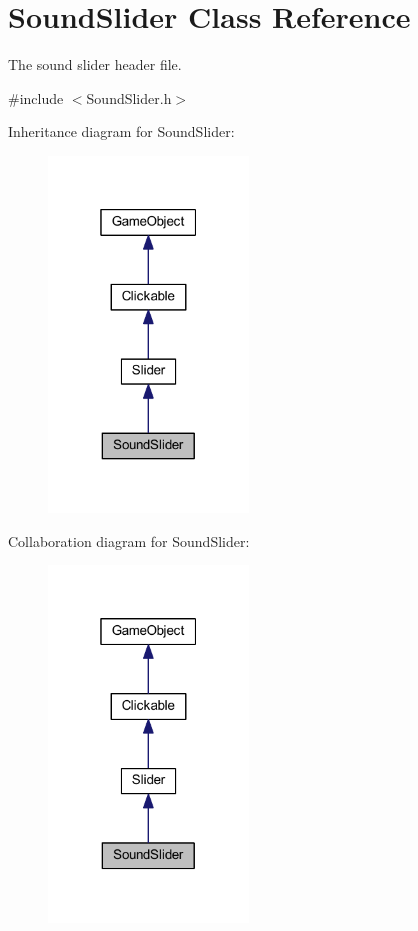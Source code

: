 \hypertarget{class_sound_slider}{\section{Sound\+Slider Class Reference}
\label{class_sound_slider}
}


The sound slider header file.  




{\ttfamily \#include $<$Sound\+Slider.\+h$>$}



Inheritance diagram for Sound\+Slider\+:
\nopagebreak
\begin{figure}[H]
\begin{center}
\leavevmode
\includegraphics[width=151pt]{class_sound_slider__inherit__graph}
\end{center}
\end{figure}


Collaboration diagram for Sound\+Slider\+:
\nopagebreak
\begin{figure}[H]
\begin{center}
\leavevmode
\includegraphics[width=151pt]{class_sound_slider__coll__graph}
\end{center}
\end{figure}
